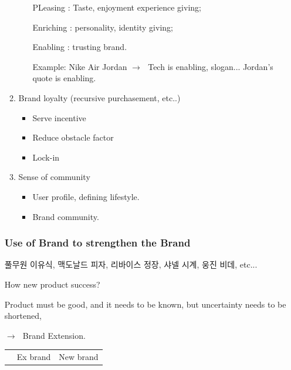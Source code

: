 \documentclass[12pt]{article}
\newcommand{\ra}{$\rightarrow \text{ }$}
\begin{document}
\begin{itemize}
\begin{enumerate}
\begin{itemize}
		 PLeasing : Taste, enjoyment experience giving;

		 Enriching : personality, identity giving;

		 Enabling : trusting brand.

		 Example: Nike Air Jordan \ra Tech is enabling, slogan... Jordan's quote is enabling.

	\end{itemize}
	\item Brand loyalty (recursive purchasement, etc..)
	\begin{itemize}
		\item Serve incentive
		\item Reduce obstacle factor
		\item Lock-in
	\end{itemize}
	\item Sense of community
	\begin{itemize}
		\item User profile, defining lifestyle.
		\item Brand community.
	\end{itemize}
\end{enumerate}

\subsubsection{Use of Brand to strengthen the Brand}


풀무원 이유식, 맥도날드 피자, 리바이스 정장, 샤넬 시계, 웅진 비데, etc...

How new product success?

Product must be good, and it needs to be known, but uncertainty needs to be shortened,

\ra Brand Extension.

\begin{tabular}{|c|c|c|}
\hline
 & Ex brand & New brand \\


\end{tabular}


\end{itemize}
\end{document}
